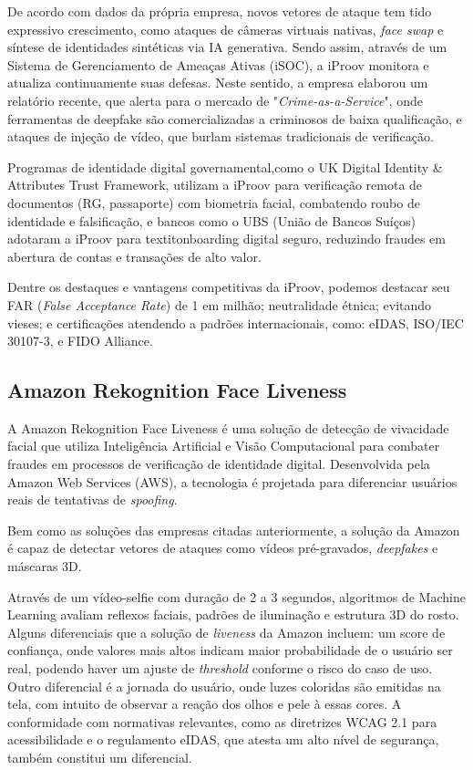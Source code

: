 De acordo com dados da própria empresa, novos vetores de ataque tem tido expressivo crescimento, como ataques de câmeras virtuais nativas, \textit{face swap} e síntese de identidades sintéticas via IA generativa. Sendo assim, através de um Sistema de Gerenciamento de Ameaças Ativas (iSOC), a iProov monitora e atualiza continuamente suas defesas. Neste sentido, a empresa elaborou um relatório recente, que alerta para o mercado de "\textit{Crime-as-a-Service}", onde ferramentas de deepfake são comercializadas a criminosos de baixa qualificação, e ataques de injeção de vídeo, que burlam sistemas tradicionais de verificação. \cite{iproov_threat_2025}

Programas de identidade digital governamental,como o UK Digital Identity \& Attributes Trust Framework, utilizam a iProov para verificação remota de documentos (RG, passaporte) com biometria facial, combatendo roubo de identidade e falsificação, e bancos como o UBS (União de Bancos Suíços) adotaram a iProov para textit{onboarding} digital seguro, reduzindo fraudes em abertura de contas e transações de alto valor.

Dentre os destaques e vantagens competitivas da iProov, podemos destacar seu FAR (\textit{False Acceptance Rate}) de 1 em milhão; neutralidade étnica; evitando vieses; e certificações atendendo a padrões internacionais, como: eIDAS, ISO/IEC 30107-3, e FIDO Alliance. \cite{iproov_2025}

\subsection{Amazon Rekognition Face Liveness}

A Amazon Rekognition Face Liveness é uma solução de detecção de vivacidade facial que utiliza Inteligência Artificial e Visão Computacional para combater fraudes em processos de verificação de identidade digital. Desenvolvida pela Amazon Web Services (AWS), a tecnologia é projetada para diferenciar usuários reais de tentativas de \textit{spoofing}.

Bem como as soluções das empresas citadas anteriormente, a solução da Amazon é capaz de detectar vetores de ataques como vídeos pré-gravados, \textit{deepfakes} e máscaras 3D. 

Através de um vídeo-selfie com duração de 2 a 3 segundos, algoritmos de Machine Learning avaliam reflexos faciais, padrões de iluminação e estrutura 3D do rosto. Alguns diferenciais que a solução de \textit{liveness} da Amazon incluem: um score de confiança, onde valores mais altos indicam maior probabilidade de o usuário ser real, podendo haver um ajuste de \textit{threshold} conforme o risco do caso de uso. Outro diferencial é a jornada do usuário, onde luzes coloridas são emitidas na tela, com intuito de observar a reação dos olhos e pele à essas cores. A conformidade com normativas relevantes, como as diretrizes WCAG 2.1 para acessibilidade e o regulamento eIDAS, que atesta um alto nível de segurança, também constitui um diferencial. \cite{aws_ai_cards_2023}

